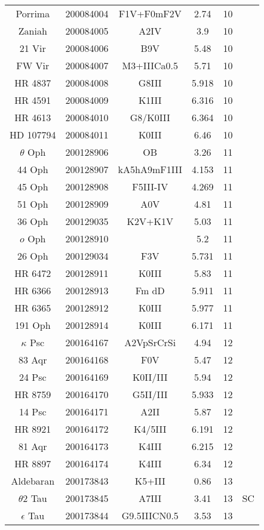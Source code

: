 \begin{table*}
\begin{tabular}{cccccc}
Porrima & 200084004 & F1V+F0mF2V & 2.74 & 10 &  \\
Zaniah & 200084005 & A2IV & 3.9 & 10 &  \\
21 Vir & 200084006 & B9V & 5.48 & 10 &  \\
FW Vir & 200084007 & M3+IIICa0.5 & 5.71 & 10 &  \\
HR 4837 & 200084008 & G8III & 5.918 & 10 &  \\
HR 4591 & 200084009 & K1III & 6.316 & 10 &  \\
HR 4613 & 200084010 & G8/K0III & 6.364 & 10 &  \\
HD 107794 & 200084011 & K0III & 6.46 & 10 &  \\
$\theta$ Oph & 200128906 & OB & 3.26 & 11 &  \\
44 Oph & 200128907 & kA5hA9mF1III & 4.153 & 11 &  \\
45 Oph & 200128908 & F5III-IV & 4.269 & 11 &  \\
51 Oph & 200128909 & A0V & 4.81 & 11 &  \\
36 Oph & 200129035 & K2V+K1V & 5.03 & 11 &  \\
$o$ Oph & 200128910 &  & 5.2 & 11 &  \\
26 Oph & 200129034 & F3V & 5.731 & 11 &  \\
HR 6472 & 200128911 & K0III & 5.83 & 11 &  \\
HR 6366 & 200128913 & Fm dD & 5.911 & 11 &  \\
HR 6365 & 200128912 & K0III & 5.977 & 11 &  \\
191 Oph & 200128914 & K0III & 6.171 & 11 &  \\
$\kappa$ Psc & 200164167 & A2VpSrCrSi & 4.94 & 12 &  \\
83 Aqr & 200164168 & F0V & 5.47 & 12 &  \\
24 Psc & 200164169 & K0II/III & 5.94 & 12 &  \\
HR 8759 & 200164170 & G5II/III & 5.933 & 12 &  \\
14 Psc & 200164171 & A2II & 5.87 & 12 &  \\
HR 8921 & 200164172 & K4/5III & 6.191 & 12 &  \\
81 Aqr & 200164173 & K4III & 6.215 & 12 &  \\
HR 8897 & 200164174 & K4III & 6.34 & 12 &  \\
Aldebaran & 200173843 & K5+III & 0.86 & 13 & \citet{Farr2018} \\
$\theta$2 Tau & 200173845 & A7III & 3.41 & 13 & SC \\
$\epsilon$ Tau & 200173844 & G9.5IIICN0.5 & 3.53 & 13 & \citet{Arentoft2019} \\

\end{tabular}
\end{table*}

